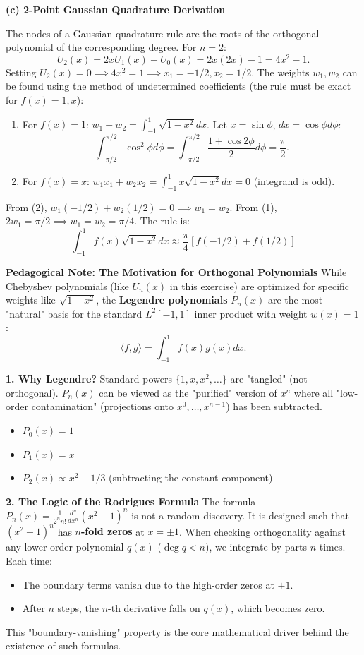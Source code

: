 \begin{solution}
\textbf{(c) 2-Point Gaussian Quadrature Derivation}

The nodes of a Gaussian quadrature rule are the roots of the orthogonal polynomial of the corresponding degree. For $n=2$:
\[ U_2(x) = 2x U_1(x) - U_0(x) = 2x(2x) - 1 = 4x^2 - 1. \]
Setting $U_2(x) = 0 \implies 4x^2 = 1 \implies \boxed{x_1 = -1/2, x_2 = 1/2}$.
The weights $w_1, w_2$ can be found using the method of undetermined coefficients (the rule must be exact for $f(x)=1, x$):
\begin{enumerate}
    \item For $f(x)=1$: $w_1 + w_2 = \int_{-1}^1 \sqrt{1-x^2} dx$. Let $x = \sin\phi$, $dx = \cos\phi d\phi$:
    \[ \int_{-\pi/2}^{\pi/2} \cos^2\phi d\phi = \int_{-\pi/2}^{\pi/2} \frac{1+\cos 2\phi}{2} d\phi = \frac{\pi}{2}. \]
    \item For $f(x)=x$: $w_1 x_1 + w_2 x_2 = \int_{-1}^1 x \sqrt{1-x^2} dx = 0$ (integrand is odd).
\end{enumerate}
From (2), $w_1(-1/2) + w_2(1/2) = 0 \implies w_1 = w_2$.
From (1), $2w_1 = \pi/2 \implies w_1 = w_2 = \pi/4$.
The rule is:
\[ \boxed{\int_{-1}^1 f(x) \sqrt{1-x^2} dx \approx \frac{\pi}{4} \left[ f(-1/2) + f(1/2) \right]} \]
\end{solution}


\textbf{Pedagogical Note: The Motivation for Orthogonal Polynomials}
While Chebyshev polynomials (like $U_n(x)$ in this exercise) are optimized for specific weights like $\sqrt{1-x^2}$, the \textbf{Legendre polynomials} $P_n(x)$ are the most "natural" basis for the standard $L^2[-1, 1]$ inner product with weight $w(x)=1$:
\[ \langle f, g \rangle = \int_{-1}^1 f(x)g(x) dx. \]

\textbf{1. Why Legendre?}
Standard powers $\{1, x, x^2, \dots\}$ are "tangled" (not orthogonal). $P_n(x)$ can be viewed as the "purified" version of $x^n$ where all "low-order contamination" (projections onto $x^0, \dots, x^{n-1}$) has been subtracted.
\begin{itemize}
    \item $P_0(x) = 1$
    \item $P_1(x) = x$
    \item $P_2(x) \propto x^2 - 1/3$ (subtracting the constant component)
\end{itemize}

\textbf{2. The Logic of the Rodrigues Formula}
The formula $P_n(x) = \frac{1}{2^n n!} \frac{d^n}{dx^n}(x^2-1)^n$ is not a random discovery. It is designed such that $(x^2-1)^n$ has \textbf{$n$-fold zeros} at $x = \pm 1$. 
When checking orthogonality against any lower-order polynomial $q(x)$ ($\deg q < n$), we integrate by parts $n$ times. Each time:
\begin{itemize}
    \item The boundary terms vanish due to the high-order zeros at $\pm 1$.
    \item After $n$ steps, the $n$-th derivative falls on $q(x)$, which becomes zero.
\end{itemize}
This "boundary-vanishing" property is the core mathematical driver behind the existence of such formulas.

